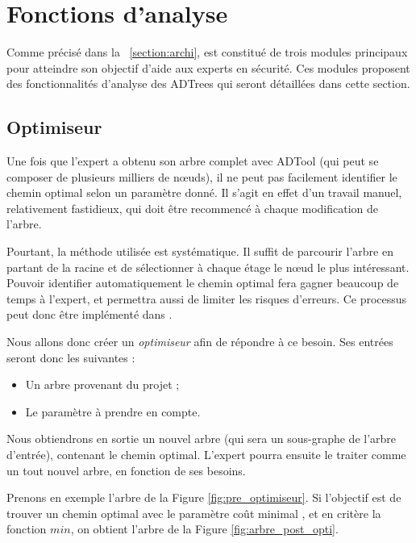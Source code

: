 \section{Fonctions d'analyse}

	
	Comme précisé dans la ~\ref{section:archi}, \glasir{} est constitué de trois modules principaux pour atteindre son objectif d'aide aux experts en sécurité. Ces modules proposent des fonctionnalités d'analyse des ADTrees qui seront détaillées dans cette section. 


	\subsection{Optimiseur}
		\label{subsection:optimiseur}

		Une fois que l'expert a obtenu son arbre complet avec ADTool (qui peut se composer de plusieurs milliers de nœuds), il ne peut pas facilement identifier le chemin optimal selon un paramètre donné. Il s'agit en effet d'un travail manuel, relativement fastidieux, qui doit être recommencé à chaque modification de l'arbre.
		
		Pourtant, la méthode utilisée est systématique. Il suffit de parcourir l'arbre en partant de la racine et de sélectionner à chaque étage le nœud le plus intéressant. Pouvoir identifier automatiquement le chemin optimal fera gagner beaucoup de temps à l'expert, et permettra aussi de limiter les risques d'erreurs. Ce processus peut donc être implémenté dans \glasir{}. 

		Nous allons donc créer un \textit{optimiseur} afin de répondre à ce besoin.
		Ses entrées seront donc les suivantes :
		\begin{itemize}
			\item Un arbre provenant du projet ;
			\item Le paramètre à prendre en compte.
		\end{itemize}
		Nous obtiendrons en sortie un nouvel arbre (qui sera un sous-graphe de l'arbre d'entrée), contenant le chemin optimal. L'expert pourra ensuite le traiter comme un tout nouvel arbre, en fonction de ses besoins.
		
		Prenons en exemple l'arbre de la {\sc Figure} \ref{fig:pre_optimiseur}. Si l'objectif est de trouver un chemin optimal avec le paramètre \og coût minimal \fg{}, et en critère la fonction $min$, on obtient l'arbre de la {\sc Figure} \ref{fig:arbre_post_opti}.
		
